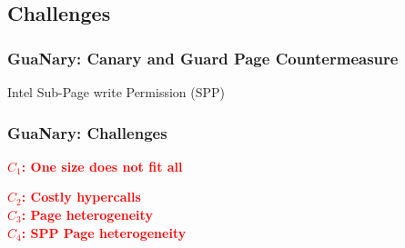 \documentclass[xcolor=table,bigger,unknownkeysallowed]{beamer}
\newcommand{\myemph}[1]{\textcolor{red}{\bf #1}}
\begin{document}
\subsection{Challenges}
\begin{frame}
	\frametitle{GuaNary: Canary and Guard Page Countermeasure}
	Intel Sub-Page write Permission (SPP)
	\begin{figure}
		\centering
	\end{figure}
\end{frame}
\begin{frame}
	\frametitle{GuaNary: Challenges}
	\myemph{$C_1$: One size does not fit all}
	\begin{figure}
		\centering
	\end{figure}	
	\pause
	\myemph{$C_2$: Costly hypercalls}\\	
	\pause
	\myemph{$C_3$: Page heterogeneity}\\	
	\pause
	\myemph{$C_4$: SPP Page heterogeneity}
	\begin{figure}
		\centering
		\begin{subfigure}{.48\linewidth}
			\centering
		\end{subfigure}
		\pause
		\begin{subfigure}{.48\linewidth}	
			\centering
		\end{subfigure}
	\end{figure}
\end{frame}
\end{document}
